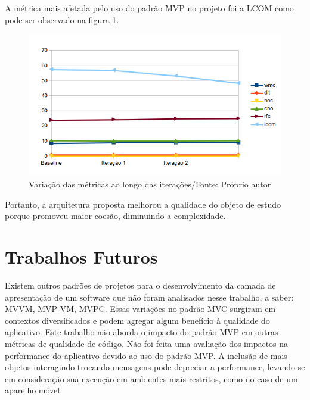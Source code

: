 A métrica mais afetada pelo uso do padrão MVP no projeto foi a LCOM como
pode ser observado na figura \ref{fig:allmetrics}.

\begin{figure}[h]
	\centering
	\includegraphics{img/allmetrics}
	\caption{Variação das métricas ao longo das iterações/Fonte: Próprio autor}
	\label{fig:allmetrics}
\end{figure}


Portanto, a arquitetura proposta melhorou a qualidade do objeto de estudo porque
promoveu maior coesão, diminuindo a complexidade.


\section{Trabalhos Futuros}

Existem outros padrões de projetos para o desenvolvimento da camada de
apresentação de um software que não foram analisados nesse trabalho, a saber: 
MVVM, MVP-VM, MVPC. Essas variações no padrão MVC surgiram em contextos
diversificados e podem agregar algum benefício à qualidade do aplicativo.
Este trabalho não aborda o impacto do padrão MVP em outras métricas de qualidade
de código.
Não foi feita uma avaliação dos impactos na performance do aplicativo devido ao
uso do padrão MVP. A inclusão de mais objetos interagindo trocando mensagens
pode depreciar a performance, levando-se em consideração sua execução em
ambientes mais restritos, como no caso de um aparelho móvel.